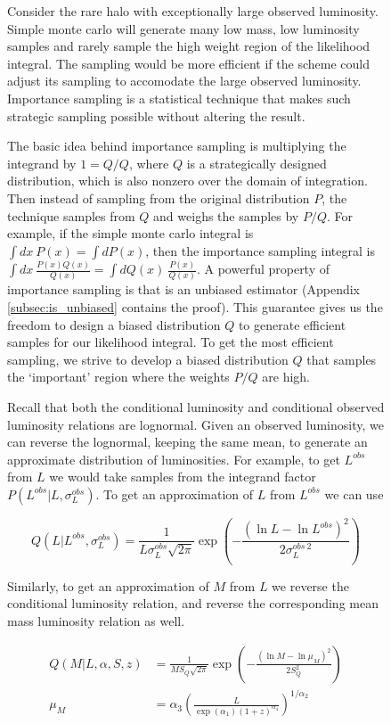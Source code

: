 \documentclass[\docopts]{\docclass}
\begin{document}
\begin{figure}[h!]
Consider the rare halo with exceptionally large observed luminosity. 
Simple monte carlo will generate many low mass, low luminosity samples and rarely sample the high weight region of the likelihood integral. 
The sampling would be more efficient if the scheme could adjust its sampling to accomodate the large observed luminosity.
Importance sampling is a statistical technique that makes such strategic sampling possible without altering the result. 

The basic idea behind importance sampling is multiplying the integrand by $1 = Q/Q$, where $Q$ is a strategically designed distribution, which is also nonzero over the domain of integration.
Then instead of sampling from the original distribution $P$, the technique samples from $Q$ and weighs the samples by $P/Q$.
For example, if the simple monte carlo integral is $\int dx\ P(x) = \int dP(x)$, then the importance sampling integral is $\int dx\ \frac{P(x)Q(x)}{Q(x)} = \int dQ(x)\ \frac{P(x)}{Q(x)}$.
A powerful property of importance sampling is that is an unbiased estimator (Appendix \ref{subsec:is_unbiased} contains the proof).
This guarantee gives us the freedom to design a biased distribution $Q$ to generate efficient samples for our likelihood integral. 
To get the most efficient sampling, we strive to develop a biased distribution $Q$ that samples the `important' region where the weights $P/Q$ are high.

Recall that both the conditional luminosity and conditional observed luminosity relations are lognormal.
Given an observed luminosity, we can reverse the lognormal, keeping the same mean, to generate an approximate distribution of luminosities.
For example, to get $L^{obs}$ from $L$ we would take samples from the integrand factor $P(L^{obs}| L, \sigma_L^{obs})$.
To get an approximation of $L$ from $L^{obs}$ we can use 

$$Q(L|L^{obs}, \sigma_L^{obs}) = \frac{1}{L\sigma_L^{obs}\sqrt{2\pi}}\exp\left(-\frac{(\ln L - \ln L^{obs})^2}{2\sigma_L^{obs\ 2}}\right)$$

Similarly, to get an approximation of $M$ from $L$ we reverse the conditional luminosity relation, and reverse the corresponding mean mass luminosity relation as well.

\begin{align*}
Q(M|L,\alpha,S,z) &= \frac{1}{MS_Q\sqrt{2\pi}}\exp\left(-\frac{(\ln M - \ln \mu_M)^2}{2S_Q^{2}}\right)\\
\mu_M &= \alpha_3 \left(\frac{L}{\exp(\alpha_1)(1+z)^{\alpha_4}}\right)^{1/\alpha_2}\\
\end{align*}


\end{figure}
\end{document}
